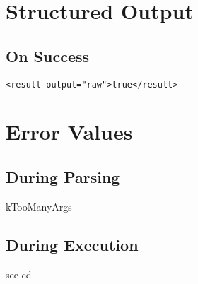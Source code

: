 \documentclass[10pt]{article}
\begin{document}
\section*{ Structured Output }
\subsection*{ On Success }
\begin{verbatim}
<result output="raw">true</result>

\end{verbatim}
\section*{ Error Values }
\subsection*{ During Parsing }


 kTooManyArgs
\subsection*{ During Execution }


 see cd
\end{document}
